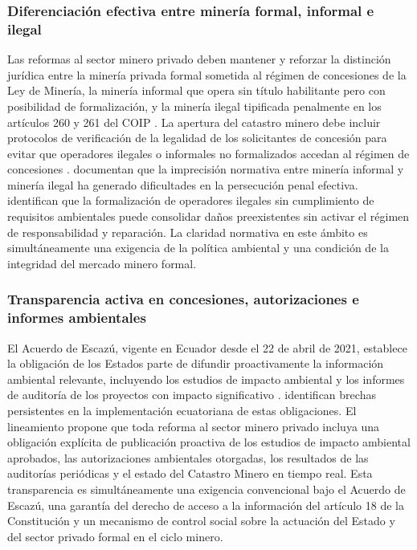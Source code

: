 \subsubsection{Diferenciación efectiva entre minería formal, informal e ilegal}

Las reformas al sector minero privado deben mantener y reforzar la distinción jurídica entre la minería privada formal sometida al régimen de concesiones de la Ley de Minería, la minería informal que opera sin título habilitante pero con posibilidad de formalización, y la minería ilegal tipificada penalmente en los artículos 260 y 261 del COIP \parencite{coip_2014,ley_mineria_2025}. La apertura del catastro minero debe incluir protocolos de verificación de la legalidad de los solicitantes de concesión para evitar que operadores ilegales o informales no formalizados accedan al régimen de concesiones \parencite{arcom_resolucion_0029_2025}. \textcite{yanez_cevallos_2022} documentan que la imprecisión normativa entre minería informal y minería ilegal ha generado dificultades en la persecución penal efectiva. \textcite{condoy_viera_2025} identifican que la formalización de operadores ilegales sin cumplimiento de requisitos ambientales puede consolidar daños preexistentes sin activar el régimen de responsabilidad y reparación. La claridad normativa en este ámbito es simultáneamente una exigencia de la política ambiental y una condición de la integridad del mercado minero formal.

\subsubsection{Transparencia activa en concesiones, autorizaciones e informes ambientales}

El Acuerdo de Escazú, vigente en Ecuador desde el 22 de abril de 2021, establece la obligación de los Estados parte de difundir proactivamente la información ambiental relevante, incluyendo los estudios de impacto ambiental y los informes de auditoría de los proyectos con impacto significativo \parencite{acuerdo_escazu_2018}. \textcite{cepal_ruta_escazu_2023} identifican brechas persistentes en la implementación ecuatoriana de estas obligaciones. El lineamiento propone que toda reforma al sector minero privado incluya una obligación explícita de publicación proactiva de los estudios de impacto ambiental aprobados, las autorizaciones ambientales otorgadas, los resultados de las auditorías periódicas y el estado del Catastro Minero en tiempo real. Esta transparencia es simultáneamente una exigencia convencional bajo el Acuerdo de Escazú, una garantía del derecho de acceso a la información del artículo 18 de la Constitución \parencite{cre_2008} y un mecanismo de control social sobre la actuación del Estado y del sector privado formal en el ciclo minero.

